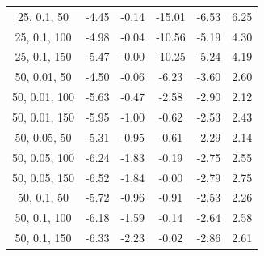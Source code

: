 \documentclass{article}
\begin{document}
\begin{table}[H]
{\begin{tabular}{|c|c|c|c|c|c|}
                25, 0.1, 50                & -4.45                      & -0.14                      & -15.01                     & -6.53                    & 6.25                    \\
                25, 0.1, 100               & -4.98                      & -0.04                      & -10.56                     & -5.19                    & 4.30                    \\
                25, 0.1, 150               & -5.47                      & -0.00                      & -10.25                     & -5.24                    & 4.19                    \\
                50, 0.01, 50               & -4.50                      & -0.06                      & -6.23                      & -3.60                    & 2.60                    \\
                50, 0.01, 100              & -5.63                      & -0.47                      & -2.58                      & -2.90                    & 2.12                    \\
                50, 0.01, 150              & -5.95                      & -1.00                      & -0.62                      & -2.53                    & 2.43                    \\
                50, 0.05, 50               & -5.31                      & -0.95                      & -0.61                      & -2.29                    & 2.14                    \\
                50, 0.05, 100              & -6.24                      & -1.83                      & -0.19                      & -2.75                    & 2.55                    \\
                50, 0.05, 150              & -6.52                      & -1.84                      & -0.00                      & -2.79                    & 2.75                    \\
                50, 0.1, 50                & -5.72                      & -0.96                      & -0.91                      & -2.53                    & 2.26                    \\
                50, 0.1, 100               & -6.18                      & -1.59                      & -0.14                      & -2.64                    & 2.58                    \\
                50, 0.1, 150               & -6.33                      & -2.23                      & -0.02                      & -2.86                    & 2.61                    \\

\end{tabular}}
\end{table}
\end{document}
